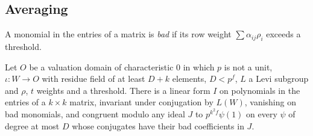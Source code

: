 \subsection{Averaging}\label{ss:averaging}
A monomial in the entries of a matrix is \emph{bad} if its row weight $\sum\alpha_{ij}\rho_i$ exceeds a threshold.

\begin{proposition}\label{prop:invariant-average}
Let $O$ be a valuation domain of characteristic $0$ in which $p$ is not a unit, $\iota\colon W\to O$ with residue field of at least $D+k$ elements, $D<p^f$, $L$ a
Levi subgroup and $\rho$, $t$ weights and a threshold. There is a linear form $I$ on polynomials in the entries of a $k\times k$ matrix, invariant under
conjugation by $L(W)$, vanishing on bad monomials, and congruent modulo any ideal $J$ to $p^{k^2f}\psi(1)$ on every $\psi$ of degree at most $D$ whose conjugates have
their bad coefficients in $J$.
\end{proposition}
